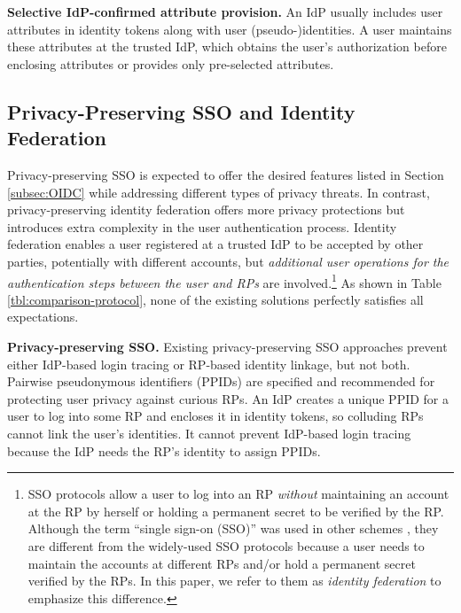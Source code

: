 \noindent\textbf{Selective IdP-confirmed attribute provision.}
An IdP usually includes user attributes in identity tokens \cite{OpenIDConnect,rfc6749} along with user (pseudo-)identities.
A user maintains these attributes at the trusted IdP,
which obtains the user's authorization before enclosing attributes or provides only pre-selected attributes.

\subsection{Privacy-Preserving SSO and Identity Federation}
\label{subsec-solutions}

Privacy-preserving SSO is expected to offer the desired features listed in Section \ref{subsec:OIDC} while addressing different types of privacy threats.
In contrast, privacy-preserving identity federation offers more privacy protections but introduces extra complexity in the user authentication process.
Identity federation enables a user registered at a trusted IdP to be accepted by other parties, potentially with different accounts,
but \emph{additional user operations for the authentication steps between the user and RPs} are involved.\footnote{SSO protocols \cite{OpenIDConnect,rfc6749, SAML, SAMLIdentifier} allow a user to log into an RP \emph{without} maintaining an account at the RP by herself or holding a permanent secret to be verified by the RP. Although the term ``single sign-on (SSO)'' was used in other schemes \cite{PseudoID, Opaak, ELPASSO, WangWS13, HanCSTW18, HanCSTWW20}, they are different from the widely-used SSO protocols because a user needs to maintain the accounts at different RPs and/or hold a permanent secret verified by the RPs. In this paper, we refer to them as \emph{identity federation} to emphasize this difference.}
As shown in Table \ref{tbl:comparison-protocol}, none of the existing solutions 
perfectly satisfies all expectations.


\noindent\textbf{Privacy-preserving SSO.}
Existing privacy-preserving SSO approaches \cite{BrowserID, SPRESSO, NIST2017draft} prevent either IdP-based login tracing or RP-based identity linkage, but not both.
Pairwise pseudonymous identifiers (PPIDs) are specified \cite{OpenIDConnect, SAMLIdentifier} and recommended \cite{NIST2017draft}
for protecting user privacy against curious RPs.
An IdP creates a unique PPID for a user to log into some RP and encloses it in identity tokens, so colluding RPs cannot link the user's identities.
It cannot prevent IdP-based login tracing because the IdP needs the RP's identity to assign PPIDs.

